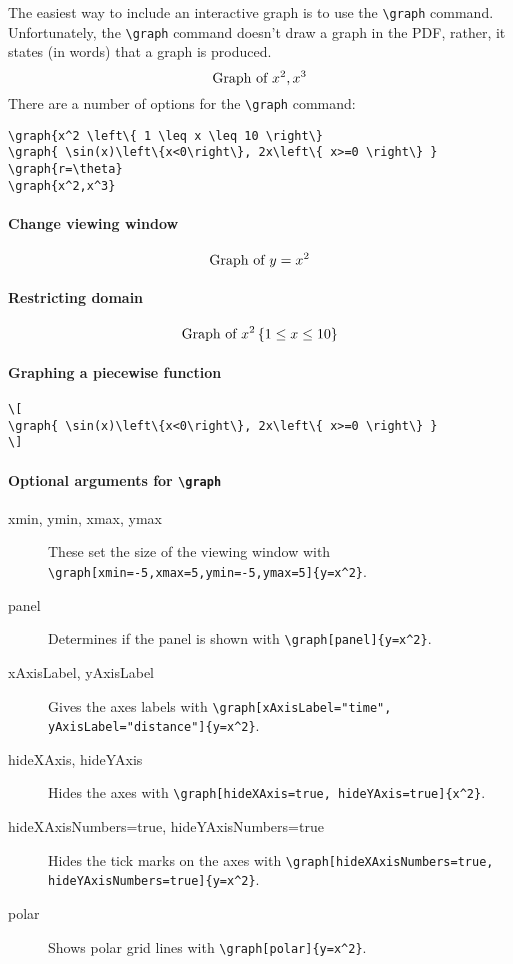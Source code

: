 \documentclass{ximera}
\begin{document}
The easiest way to include an interactive graph is to use the
\verb|\graph| command. Unfortunately, the \verb|\graph| command
doesn't draw a graph in the PDF, rather, it states (in words) that a
graph is produced.
\[
  \graph{x^2,x^3}
\]
There are a number of options for the \verb|\graph| command:

\begin{example}
\begin{verbatim}
\graph{x^2 \left\{ 1 \leq x \leq 10 \right\}
\graph{ \sin(x)\left\{x<0\right\}, 2x\left\{ x>=0 \right\} } 
\graph{r=\theta}  
\graph{x^2,x^3}
\end{verbatim}
\end{example}

\paragraph{Change viewing window}
\[
  \graph[xmin=-5,xmax=5,ymin=-5,ymax=5]{y=x^2}
\]

\paragraph{Restricting domain}
\[
  \graph{x^2 \left\{ 1 \leq x \leq 10 \right\} }
\]

\paragraph{Graphing a piecewise function}

\begin{example}
  \begin{verbatim}
\[
\graph{ \sin(x)\left\{x<0\right\}, 2x\left\{ x>=0 \right\} }
\]
\end{verbatim}
\end{example}





\paragraph{Optional arguments for \texttt{\textbackslash graph}}

\begin{description}
  \item[xmin, ymin, xmax, ymax] These set the
    size of the viewing window with
    \verb|\graph[xmin=-5,xmax=5,ymin=-5,ymax=5]{y=x^2}|.
  \item[panel] Determines if the panel is shown with
    \verb|\graph[panel]{y=x^2}|.
  \item[xAxisLabel, yAxisLabel] Gives the axes labels with \verb|\graph[xAxisLabel="time", yAxisLabel="distance"]{y=x^2}|.
  \item[hideXAxis, hideYAxis] Hides the axes with 
  \verb|\graph[hideXAxis=true, hideYAxis=true]{x^2}|.
  \item[hideXAxisNumbers=true, hideYAxisNumbers=true] Hides the tick marks on the axes with \verb|\graph[hideXAxisNumbers=true, hideYAxisNumbers=true]{y=x^2}|.
  \item[polar] Shows polar grid lines with \verb|\graph[polar]{y=x^2}|.
\end{description}
\end{document}
